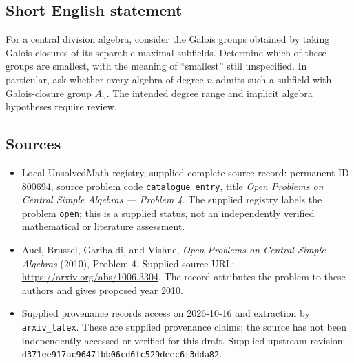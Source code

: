 \documentclass[11pt]{article}
\begin{document}
\subsection{Short English statement}
For a central division algebra, consider the Galois groups obtained by taking Galois closures of its separable maximal subfields. Determine which of these groups are smallest, with the meaning of ``smallest'' still unspecified. In particular, ask whether every algebra of degree \(n\) admits such a subfield with Galois-closure group \(A_n\). The intended degree range and implicit algebra hypotheses require review.
\subsection{Sources}
\begin{itemize}
\item Local UnsolvedMath registry, supplied complete source record: permanent ID \(800694\), source problem code \texttt{catalogue entry}, title \emph{Open Problems on Central Simple Algebras --- Problem 4}. The supplied registry labels the problem \texttt{open}; this is a supplied status, not an independently verified mathematical or literature assessment.
\item Auel, Brussel, Garibaldi, and Vishne, \emph{Open Problems on Central Simple Algebras} (2010), Problem 4. Supplied source URL: \url{https://arxiv.org/abs/1006.3304}. The record attributes the problem to these authors and gives proposed year 2010.
\item Supplied provenance records access on 2026-10-16 and extraction by \texttt{arxiv\_latex}. These are supplied provenance claims; the source has not been independently accessed or verified for this draft. Supplied upstream revision: \texttt{d371ee917ac9647fbb06cd6fc529deec6f3dda82}.
\end{itemize}
\end{document}
